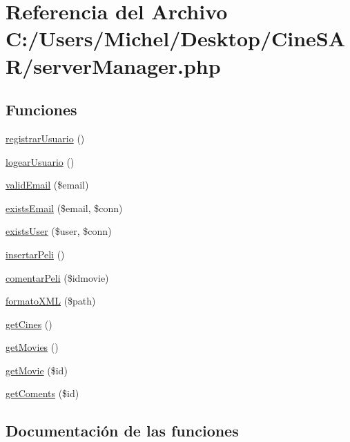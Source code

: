 \hypertarget{server_manager_8php}{}\section{Referencia del Archivo C\+:/\+Users/\+Michel/\+Desktop/\+Cine\+S\+A\+R/server\+Manager.php}
\label{server_manager_8php}
\subsection*{Funciones}
\begin{DoxyCompactItemize}
\item 
\mbox{\hyperlink{server_manager_8php_abeae2072dd7ffa5b78da10599eac6f57}{registrar\+Usuario}} ()
\item 
\mbox{\hyperlink{server_manager_8php_ab2dbd54cec9085bdf37669044a6400ea}{logear\+Usuario}} ()
\item 
\mbox{\hyperlink{server_manager_8php_a73637e760498c5cea55074896ec982ac}{valid\+Email}} (\$email)
\item 
\mbox{\hyperlink{server_manager_8php_ae11c1d4bc35a0e731d6c06d99ed1a48f}{exists\+Email}} (\$email, \$conn)
\item 
\mbox{\hyperlink{server_manager_8php_a51df6b16fb354abb57b1e2b7df901faf}{exists\+User}} (\$user, \$conn)
\item 
\mbox{\hyperlink{server_manager_8php_aea99533bc26bc9f13ff095ef792636ea}{insertar\+Peli}} ()
\item 
\mbox{\hyperlink{server_manager_8php_aa2f6bd89b72e28721df58798a8468d8e}{comentar\+Peli}} (\$idmovie)
\item 
\mbox{\hyperlink{server_manager_8php_ab4f3bf12b92f40682511b689e9844461}{formato\+X\+ML}} (\$path)
\item 
\mbox{\hyperlink{server_manager_8php_ac56532a15e25498ecfc3ce334217adb2}{get\+Cines}} ()
\item 
\mbox{\hyperlink{server_manager_8php_af16c238f2a71b7a08ff95871ae64c825}{get\+Movies}} ()
\item 
\mbox{\hyperlink{server_manager_8php_a7b9eed7e71146a4086047f9eaaf59985}{get\+Movie}} (\$id)
\item 
\mbox{\hyperlink{server_manager_8php_a165bd4fb886e760759845a26ed7d1c2f}{get\+Coments}} (\$id)
\end{DoxyCompactItemize}


\subsection{Documentación de las funciones}
\mbox{\label{server_manager_8php_aa2f6bd89b72e28721df58798a8468d8e}} 
